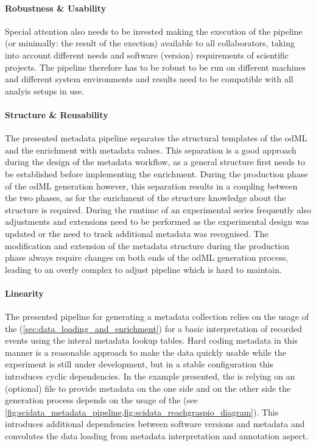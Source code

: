 \paragraph{Robustness \& Usability}
Special attention also needs to be invested making the execution of the pipeline (or minimally: the result of the exection) available to all collaborators, taking into account different needs and software (version) requirements of scientific projects. The pipeline therefore has to be robust to be run on different machines and different system environments and results need to be compatible with all analyis setups in use.

\paragraph{Structure \& Reusability} The presented metadata pipeline separates the structural templates of the odML and the enrichment with metadata values. This separation is a good approach during the design of the metadata workflow, as a general structure first needs to be established before implementing the enrichment. During the production phase of the odML generation however, this separation results in a coupling between the two phases, as for the enrichment of the  structure knowledge about the structure is required. During the runtime of an experimental series frequently also adjustments and extensions need to be performed as the experimental design was updated or the need to track additional metadata was recognised. The modification and extension of the metadata structure during the production phase always require changes on both ends of the odML generation process, leading to an overly complex to adjust pipeline which is hard to maintain.

\paragraph{Linearity}
The presented pipeline for generating a metadata collection relies on the usage of the  (\ref{sec:data_loading_and_enrichment}) for a basic interpretation of recorded events using the interal metadata lookup tables. Hard coding metadata in this manner is a reasonable approach to make the data quickly usable while the experiment is still under development, but in a stable configuration this introduces cyclic dependencies. In the example presented, the  is relying on an (optional)  file to provide metadata on the one side and on the other side the  generation process depends on the usage of the  (see \ref{fig:scidata_metadata_pipeline,fig:scidata_reachgraspio_diagram}). This introduces additional dependencies between software versions and metadata and convolutes the data loading from metadata interpretation and annotation aspect.

